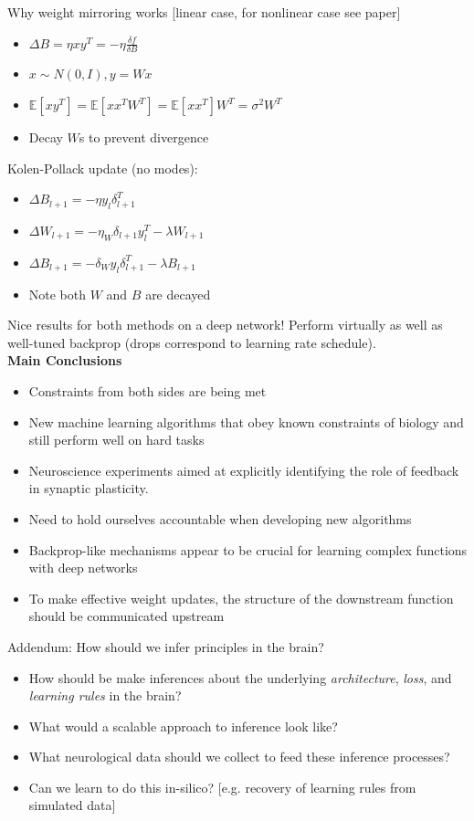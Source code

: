 \documentclass[12pt]{article}
\begin{document}
Why weight mirroring works [linear case, for nonlinear case see paper]
\begin{itemize}
\item $\Delta B = \eta xy^T = -\eta \frac{\delta f}{\delta B}$
\item $x \sim N(0,I), y = Wx$
\item $\mathbb{E}[xy^T] = \mathbb{E}[xx^TW^T] = \mathbb{E}[xx^T]W^T = \sigma^2 W^T$
\item Decay $W$s to prevent divergence
\end{itemize}

Kolen-Pollack update (no modes): 
\begin{itemize}
    \item $\Delta B_{l+1} = -\eta y_l \delta_{l+1}^T$
    \item $\Delta W_{l+1} = -\eta_W \delta_{l+1} y_l^T - \lambda W_{l+1}$
    \item $\Delta B_{l+1} = -\delta_W y_l \delta_{l+1}^T - \lambda B_{l+1}$
    \item Note both $W$ and $B$ are decayed
\end{itemize}

Nice results for both methods on a deep network! Perform virtually as well as well-tuned backprop (drops correspond to learning rate schedule). \\

\textbf{Main Conclusions} 
\begin{itemize}
    \item Constraints from both sides are being met
    \item New machine learning algorithms that obey known constraints of biology and still perform well on hard tasks 
    \item Neuroscience experiments aimed at explicitly identifying the role of feedback in synaptic plasticity.
    \item Need to hold ourselves accountable when developing new algorithms
    \item Backprop-like mechanisms appear to be crucial for learning complex functions with deep networks
    \item To make effective weight updates, the structure of the downstream function should be communicated upstream
\end{itemize}

Addendum: How should we infer principles in the brain?
\begin{itemize}
    \item How should be make inferences about the underlying \textit{architecture}, \textit{loss}, and \textit{learning rules} in the brain?
    \item What would a scalable approach to inference look like?
    \item What neurological data should we collect to feed these inference processes?
    \item Can we learn to do this in-silico? [e.g. recovery of learning rules from simulated data]
\end{itemize}
\end{document}
